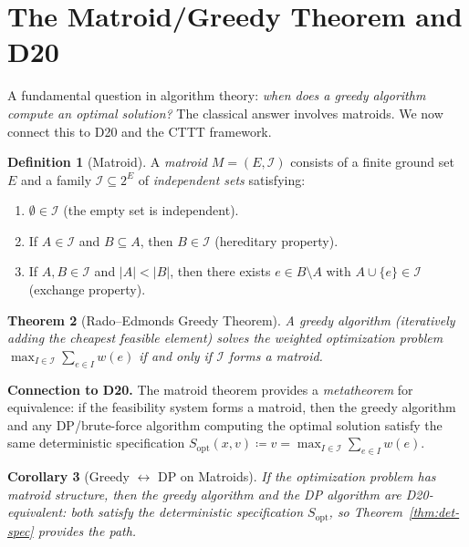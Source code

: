 \documentclass[11pt,a4paper]{report}
\theoremstyle{definition}
\newtheorem{definition}{Definition}[chapter]
\theoremstyle{plain}
\newtheorem{theorem}[definition]{Theorem}
\newtheorem{corollary}[definition]{Corollary}
\begin{document}

\section{The Matroid/Greedy Theorem and D20}
\label{sec:matroid-greedy}

A fundamental question in algorithm theory:
\emph{when does a greedy algorithm compute an optimal solution?}
The classical answer involves matroids.  We now connect this to
D20 and the CTTT framework.

\begin{definition}[Matroid]
A \emph{matroid} $M = (E, \mathcal{I})$ consists of a finite ground
set $E$ and a family $\mathcal{I} \subseteq 2^E$ of \emph{independent
sets} satisfying:
\begin{enumerate}
  \item $\emptyset \in \mathcal{I}$ (the empty set is independent).
  \item If $A \in \mathcal{I}$ and $B \subseteq A$, then
    $B \in \mathcal{I}$ (hereditary property).
  \item If $A, B \in \mathcal{I}$ and $|A| < |B|$, then there
    exists $e \in B \setminus A$ with $A \cup \{e\} \in \mathcal{I}$
    (exchange property).
\end{enumerate}
\end{definition}

\begin{theorem}[Rado--Edmonds Greedy Theorem]
\label{thm:matroid-greedy}
A greedy algorithm (iteratively adding the cheapest feasible element)
solves the weighted optimization problem
$\max_{I \in \mathcal{I}} \sum_{e \in I} w(e)$
if and only if $\mathcal{I}$ forms a matroid.
\end{theorem}

\noindent\textbf{Connection to D20.}
The matroid theorem provides a \emph{metatheorem} for equivalence:
if the feasibility system forms a matroid, then the greedy algorithm
and any DP/brute-force algorithm computing the optimal solution
satisfy the same deterministic specification $S_{\mathrm{opt}}(x, v)
\coloneqq v = \max_{I \in \mathcal{I}} \sum_{e \in I} w(e)$.

\begin{corollary}[Greedy $\leftrightarrow$ DP on Matroids]
\label{cor:greedy-dp}
If the optimization problem has matroid structure, then the greedy
algorithm and the DP algorithm are D20-equivalent: both satisfy the
deterministic specification $S_{\mathrm{opt}}$, so
Theorem~\ref{thm:det-spec} provides the path.
\end{corollary}
\end{document}
